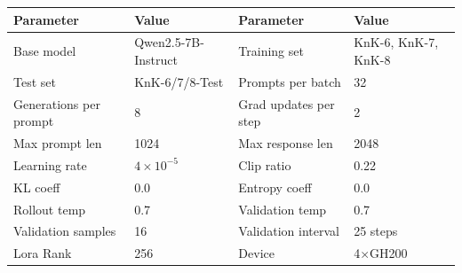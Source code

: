 \documentclass{article}
\theoremstyle{plain}
\theoremstyle{definition}
\theoremstyle{remark}
\begin{document}
\begin{table}[h]
  \centering
  \label{tab:config-knk-hard}
  \begin{tcolorbox}[
    enhanced, hbox,
    title={Training setup for KnK-Hard},
    colback=teal!5, colframe=teal, coltext=black, coltitle=white,
    fonttitle=\bfseries, arc=1mm, boxrule=1pt, boxsep=1pt,
    left=2pt, right=2pt, top=0pt, bottom=2pt,
    toptitle=3pt, bottomtitle=3pt, center
  ]
    \small
    \renewcommand{\arraystretch}{1.2}
    \setlength{\tabcolsep}{8pt}
    \begin{tabular}{l|l|l|l}
      \textbf{Parameter} & \textbf{Value} & \textbf{Parameter} & \textbf{Value} \\
      \hline
      Base model & Qwen2.5-7B-Instruct & Training set & KnK-6, KnK-7, KnK-8 \\
      Test set & KnK-6/7/8-Test & Prompts per batch & 32 \\
      Generations per prompt & 8 & Grad updates per step & 2 \\
      Max prompt len & 1024 & Max response len & 2048 \\
      Learning rate & $4 \times 10^{-5}$ & Clip ratio & 0.22 \\
      KL coeff & 0.0 & Entropy coeff & 0.0 \\
      Rollout temp & 0.7 & Validation temp & 0.7 \\
      Validation samples & 16 & Validation interval & 25 steps \\
      Lora Rank & 256 & Device & 4$\times$GH200 \\
    \end{tabular}
  \end{tcolorbox}
\end{table}
\end{document}
